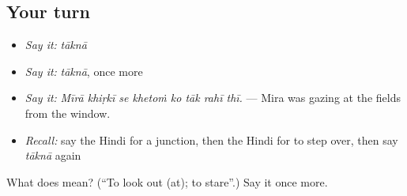 \subsection*{Your turn}
\begin{itemize}
\raggedright
  \item \emph{Say it:} \emph{tāknā}
  \item \emph{Say it:} \emph{tāknā}, once more
  \item \emph{Say it:} \emph{Mīrā khiṛkī se khetoṁ ko tāk rahī thī.} — Mira was gazing at the fields from the window.
  \item \emph{Recall:} say the Hindi for a junction, then the Hindi for to step over, then say \emph{tāknā} again
\end{itemize}

\begin{tcolorbox}[breakable,colback=teal!4,colframe=teal!35!black,title={Before you move on}]
What does  mean? (\textquotedblleft{}To look out (at); to stare\textquotedblright{}.) Say it once more.
\end{tcolorbox}

